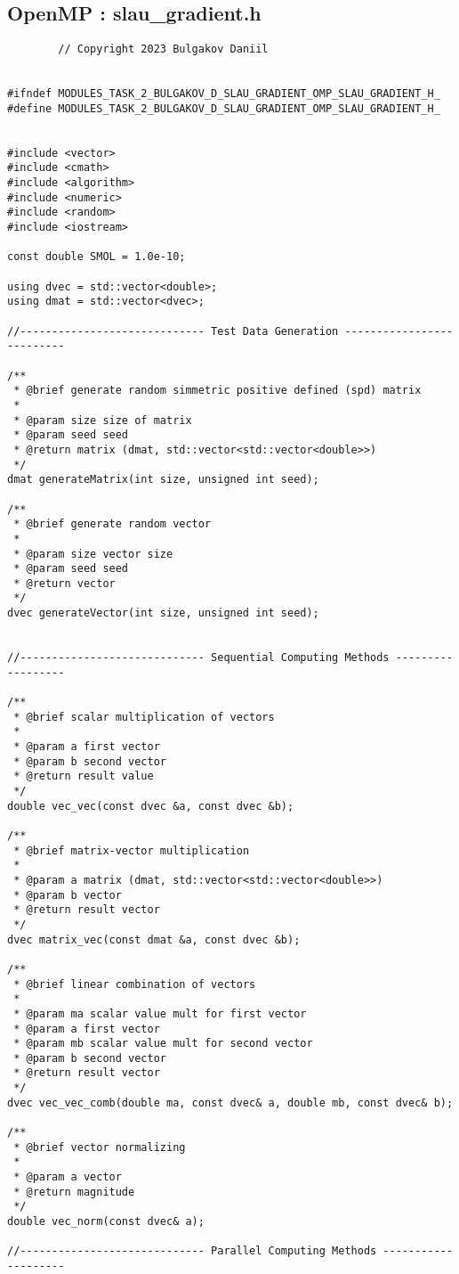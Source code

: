 \documentclass[14pt, russian]{extarticle}
\begin{document}
        \subsection{OpenMP : slau\_gradient.h}
        \begin{lstlisting}
        // Copyright 2023 Bulgakov Daniil


#ifndef MODULES_TASK_2_BULGAKOV_D_SLAU_GRADIENT_OMP_SLAU_GRADIENT_H_
#define MODULES_TASK_2_BULGAKOV_D_SLAU_GRADIENT_OMP_SLAU_GRADIENT_H_


#include <vector>
#include <cmath>
#include <algorithm>
#include <numeric>
#include <random>
#include <iostream>

const double SMOL = 1.0e-10;

using dvec = std::vector<double>;
using dmat = std::vector<dvec>;

//----------------------------- Test Data Generation --------------------------

/**
 * @brief generate random simmetric positive defined (spd) matrix
 * 
 * @param size size of matrix
 * @param seed seed
 * @return matrix (dmat, std::vector<std::vector<double>>)
 */
dmat generateMatrix(int size, unsigned int seed);

/**
 * @brief generate random vector
 * 
 * @param size vector size
 * @param seed seed
 * @return vector
 */
dvec generateVector(int size, unsigned int seed);


//----------------------------- Sequential Computing Methods ------------------

/**
 * @brief scalar multiplication of vectors
 * 
 * @param a first vector
 * @param b second vector
 * @return result value 
 */
double vec_vec(const dvec &a, const dvec &b);

/**
 * @brief matrix-vector multiplication
 * 
 * @param a matrix (dmat, std::vector<std::vector<double>>)
 * @param b vector
 * @return result vector
 */
dvec matrix_vec(const dmat &a, const dvec &b);

/**
 * @brief linear combination of vectors
 * 
 * @param ma scalar value mult for first vector
 * @param a first vector
 * @param mb scalar value mult for second vector
 * @param b second vector
 * @return result vector
 */
dvec vec_vec_comb(double ma, const dvec& a, double mb, const dvec& b);

/**
 * @brief vector normalizing
 * 
 * @param a vector
 * @return magnitude 
 */
double vec_norm(const dvec& a);

//----------------------------- Parallel Computing Methods --------------------


\end{lstlisting}
\end{document}

